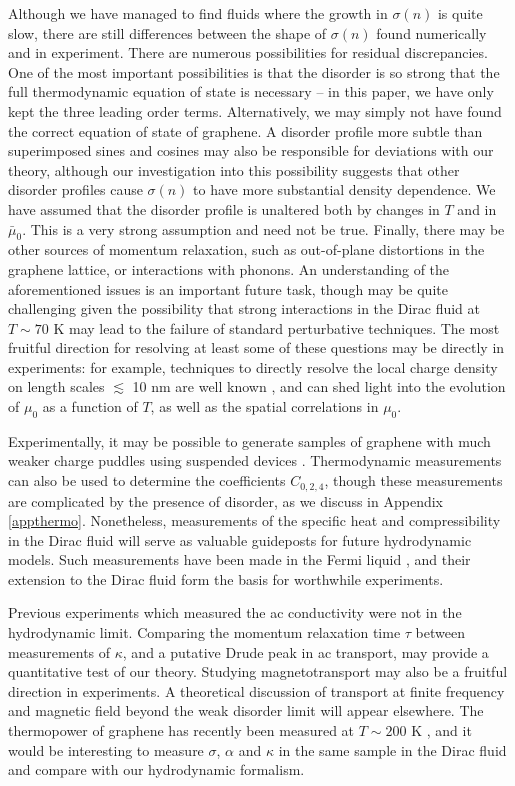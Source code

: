   Although we have managed to find fluids where the growth in $\sigma(n)$ is quite slow, there are still differences between the shape of $\sigma(n)$ found numerically and in experiment.   There are numerous possibilities for residual discrepancies.   One of the most important possibilities is that the disorder is so strong that the full thermodynamic equation of state is necessary -- in this paper, we have only kept the three leading order terms.   Alternatively, we may simply not have found the correct equation of state of graphene.  A disorder profile more subtle than superimposed sines and cosines may also be responsible for deviations with our theory, although our investigation into this possibility suggests that other disorder profiles cause $\sigma(n)$ to have more substantial density dependence.    We have assumed that the disorder profile is unaltered both by changes in $T$ and in $\bar\mu_0$.   This is a very strong assumption and need not be true.   Finally, there may be other sources of momentum relaxation, such as out-of-plane distortions in the graphene lattice, or interactions with phonons.   An understanding of the aforementioned issues is an important future task, though may be quite challenging given the possibility that strong interactions in the Dirac fluid at $T\sim 70$ K may lead to the failure of standard perturbative techniques.   The most fruitful direction for resolving at least some of these questions may be directly in experiments: for example, techniques to directly resolve the local charge density on length scales $\lesssim$ 10 nm are well known \cite{xue_scanning_2011}, and can shed light into the evolution of $\mu_0$ as a function of $T$, as well as the spatial correlations in $\mu_0$.
  
Experimentally, it may be possible to generate samples of graphene with much weaker charge puddles using suspended devices \cite{bolotin_ultrahigh_2008, mayorov_how_2012}.  Thermodynamic measurements can also be used to determine the coefficients $C_{0,2,4}$, though these measurements are complicated by the presence of disorder, as we discuss in Appendix \ref{appthermo}.   Nonetheless, measurements of the specific heat and compressibility in the Dirac fluid will serve as valuable guideposts for future hydrodynamic models.   Such measurements have been made in the Fermi liquid \cite{martin_observation_2008}, and their extension to the Dirac fluid form the basis for worthwhile experiments.

Previous experiments which measured the ac conductivity \cite{horng_drude_2011} were not in the hydrodynamic limit.   Comparing the momentum relaxation time $\tau$ between measurements of $\kappa$, and a putative Drude peak in ac transport, may provide a quantitative test of our theory.   Studying magnetotransport \cite{hartnoll_theory_2007} may also be a fruitful direction in experiments.  A theoretical discussion of transport at finite frequency and magnetic field beyond the weak disorder limit will appear elsewhere.   The thermopower  of graphene has recently been measured at $T\sim 200$ K \cite{ghahari_enhanced_2016},  and it would be interesting to measure $\sigma$, $\alpha$ and $\kappa$ in the same sample in the Dirac fluid and compare with our hydrodynamic formalism.